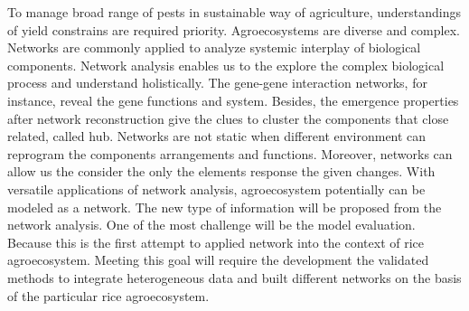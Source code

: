 To manage broad range of pests in sustainable way of agriculture, understandings of yield constrains are required priority. Agroecosystems are diverse and complex. Networks are commonly applied to analyze systemic interplay of biological components. Network analysis enables us to the explore the complex biological process and understand holistically. The gene-gene interaction networks, for instance, reveal the gene functions and system. Besides, the emergence properties after network reconstruction give the clues to cluster the components that close related, called hub. Networks are not static when different environment can reprogram the components arrangements and functions. Moreover, networks can allow us the consider the only the elements response the given changes. With versatile applications of network analysis, agroecosystem potentially can be modeled as a network. The new type of information will be proposed from the network analysis. One of the most challenge will be the model evaluation. Because this is the first attempt to applied network into the context of rice agroecosystem. Meeting this goal will require the development the validated methods to integrate heterogeneous data and built different networks on the basis of the particular rice agroecosystem.